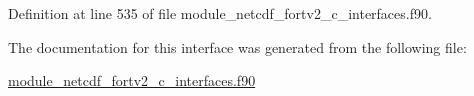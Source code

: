 Definition at line 535 of file module\+\_\+netcdf\+\_\+fortv2\+\_\+c\+\_\+interfaces.\+f90.



The documentation for this interface was generated from the following file\+:\begin{DoxyCompactItemize}
\item 
\hyperlink{module__netcdf__fortv2__c__interfaces_8f90}{module\+\_\+netcdf\+\_\+fortv2\+\_\+c\+\_\+interfaces.\+f90}\end{DoxyCompactItemize}
